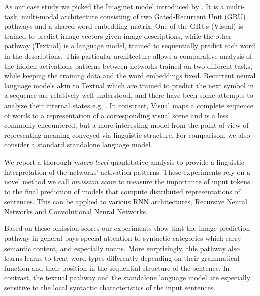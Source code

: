 As our case study we picked the {\sc Imaginet} model introduced by \label{explainimaginet}
. It is a multi-task, multi-modal
architecture consisting of two Gated-Recurrent Unit (GRU)
\cite{cho2014properties,chung2014empirical} pathways and
a shared word embedding matrix. One of the GRUs ({\sc Visual}) is
trained to predict image vectors given image descriptions, while the other
pathway ({\sc Textual}) is a language model, trained to sequentially predict each
word in the descriptions. This particular
architecture allows a comparative analysis of the hidden activations
patterns between networks trained on two different tasks, while
keeping the training data and the word embeddings fixed. Recurrent neural
language models akin to {\sc Textual} which are trained to predict the
next symbol in a sequence are relatively well understood, and there
have been some attempts to analyze their internal states e.g.
\cite{elman1991distributed,karpathy2015visualizing}. In
constrast, {\sc Visual} maps a complete sequence of words to
a representation of a corresponding visual scene and is a less
commonly encountered, but a more interesting model from the point of
view of representing meaning conveyed via linguistic structure.
For comparison, we also consider a standard standalone language model.

We report a thorough \emph{macro level} quantitative analysis to
provide a linguistic interpretation of the networks' activation
patterns. These experiments rely on a novel method we
call \emph{omission score} to measure the importance of input tokens 
to the final prediction of models that compute distributed representations 
of sentences. This can be applied to various RNN architectures, Recursive Neural Networks 
and Convolutional Neural Networks.\label{edit:introomissiongeneral}

Based on these omission scores our experiments show that the image
prediction pathway in general pays special attention to syntactic
categories which carry semantic content, and especially nouns. More
surprisingly, this pathway also learns learns to treat word types
differently depending on their grammatical function and their position
in the sequential structure of the sentence. In contrast, the textual
pathway and the standalone language model are especially sensitive to
the local syntactic characteristics of the input sentences.

